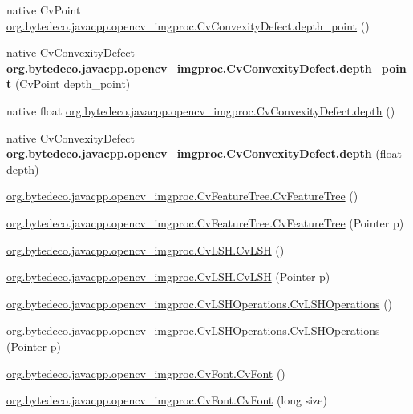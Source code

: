 \begin{DoxyCompactItemize}
\item 
native Cv\+Point \hyperlink{group__imgproc_ga7de5f58f386b3cf8bef96739d89a24cb}{org.\+bytedeco.\+javacpp.\+opencv\+\_\+imgproc.\+Cv\+Convexity\+Defect.\+depth\+\_\+point} ()
\item 
\mbox{\label{group__imgproc_ga633bdf0f4c3d06acebdf7b2da8cff4a0}} 
native Cv\+Convexity\+Defect {\bfseries org.\+bytedeco.\+javacpp.\+opencv\+\_\+imgproc.\+Cv\+Convexity\+Defect.\+depth\+\_\+point} (Cv\+Point depth\+\_\+point)
\item 
native float \hyperlink{group__imgproc_ga8baffaba023fa380d056b4686becfd86}{org.\+bytedeco.\+javacpp.\+opencv\+\_\+imgproc.\+Cv\+Convexity\+Defect.\+depth} ()
\item 
\mbox{\label{group__imgproc_gac265d8eb5b051226ff167fb9fd5efe61}} 
native Cv\+Convexity\+Defect {\bfseries org.\+bytedeco.\+javacpp.\+opencv\+\_\+imgproc.\+Cv\+Convexity\+Defect.\+depth} (float depth)
\item 
\hyperlink{group__imgproc_ga64f131e4a0b5b9bba476aeb72e312149}{org.\+bytedeco.\+javacpp.\+opencv\+\_\+imgproc.\+Cv\+Feature\+Tree.\+Cv\+Feature\+Tree} ()
\item 
\hyperlink{group__imgproc_gab59ec65713a2411ca46f665e7ed0ed65}{org.\+bytedeco.\+javacpp.\+opencv\+\_\+imgproc.\+Cv\+Feature\+Tree.\+Cv\+Feature\+Tree} (Pointer p)
\item 
\hyperlink{group__imgproc_gaaeb804ef7f6cb4b94f94461f5076c801}{org.\+bytedeco.\+javacpp.\+opencv\+\_\+imgproc.\+Cv\+L\+S\+H.\+Cv\+L\+SH} ()
\item 
\hyperlink{group__imgproc_gae5c4e2c53fa50e1dd7dd6aa81c31b5ee}{org.\+bytedeco.\+javacpp.\+opencv\+\_\+imgproc.\+Cv\+L\+S\+H.\+Cv\+L\+SH} (Pointer p)
\item 
\hyperlink{group__imgproc_gaabec493f329bf6b4f40358564e943ed6}{org.\+bytedeco.\+javacpp.\+opencv\+\_\+imgproc.\+Cv\+L\+S\+H\+Operations.\+Cv\+L\+S\+H\+Operations} ()
\item 
\hyperlink{group__imgproc_ga71648279df2a0c93cb7616055661e4e8}{org.\+bytedeco.\+javacpp.\+opencv\+\_\+imgproc.\+Cv\+L\+S\+H\+Operations.\+Cv\+L\+S\+H\+Operations} (Pointer p)
\item 
\hyperlink{group__imgproc_ga53abe9deb6276658b9dc59eed7558c14}{org.\+bytedeco.\+javacpp.\+opencv\+\_\+imgproc.\+Cv\+Font.\+Cv\+Font} ()
\item 
\hyperlink{group__imgproc_ga975d7e1cd96341017ba94edf5d67c293}{org.\+bytedeco.\+javacpp.\+opencv\+\_\+imgproc.\+Cv\+Font.\+Cv\+Font} (long size)

\end{DoxyCompactItemize}
